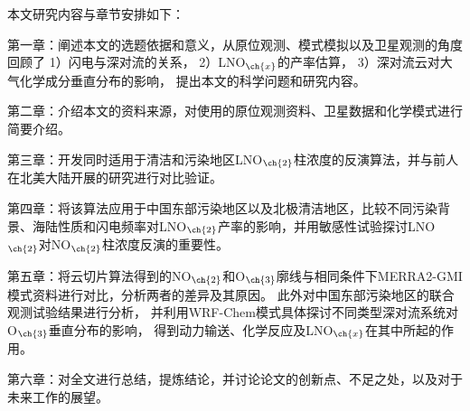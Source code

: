 本文研究内容与章节安排如下：

第一章：阐述本文的选题依据和意义，从原位观测、模式模拟以及卫星观测的角度回顾了
1）闪电与深对流的关系，
2）LNO$_{\ch{x}}$的产率估算，
3）深对流云对大气化学成分垂直分布的影响，
提出本文的科学问题和研究内容。

第二章：介绍本文的资料来源，对使用的原位观测资料、卫星数据和化学模式进行简要介绍。

第三章：开发同时适用于清洁和污染地区LNO$_{\ch{2}}$柱浓度的反演算法，并与前人在北美大陆开展的研究进行对比验证。

第四章：将该算法应用于中国东部污染地区以及北极清洁地区，比较不同污染背景、海陆性质和闪电频率对LNO$_{\ch{2}}$产率的影响，并用敏感性试验探讨LNO$_{\ch{2}}$对NO$_{\ch{2}}$柱浓度反演的重要性。

第五章：将云切片算法得到的NO$_{\ch{2}}$和O$_{\ch{3}}$廓线与相同条件下MERRA2-GMI模式资料进行对比，分析两者的差异及其原因。
此外对中国东部污染地区的联合观测试验结果进行分析，
并利用WRF-Chem模式具体探讨不同类型深对流系统对O$_{\ch{3}}$垂直分布的影响，
得到动力输送、化学反应及LNO$_{\ch{x}}$在其中所起的作用。

第六章：对全文进行总结，提炼结论，并讨论论文的创新点、不足之处，以及对于未来工作的展望。
